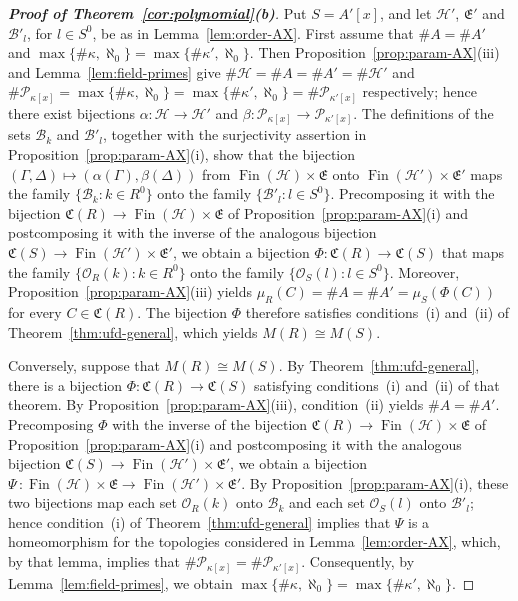 \documentclass[12pt,reqno,a4paper]{amsart}
\newcommand{\Pe}{\mathcal{P}}
\DeclareMathOperator{\Fin}{Fin}
\theoremstyle{plain}
\theoremstyle{definition}
\begin{document}
\begin{proof}[\normalfont\bfseries Proof of Theorem~\ref{cor:polynomial}(b)]
Put $S=A'[x]$, and let $\mathcal{H}'$, $\mathfrak{E}'$ and $\mathcal{B}'_l$, for $l\in S^0$, be as in Lemma~\ref{lem:order-AX}. First assume that $\#A=\#A'$ and $\max\{\#\kappa,\aleph_0\}=\max\{\#\kappa',\aleph_0\}$. Then Proposition~\ref{prop:param-AX}(iii) and Lemma~\ref{lem:field-primes} give $\#\mathcal{H}=\#A=\#A'=\#\mathcal{H}'$ and $\#\Pe_{\kappa[x]}=\max\{\#\kappa,\aleph_0\}=\max\{\#\kappa',\aleph_0\}=\#\Pe_{\kappa'[x]}$ respectively; hence there exist bijections $\alpha\colon\mathcal{H}\to\mathcal{H}'$ and $\beta\colon\Pe_{\kappa[x]}\to\Pe_{\kappa'[x]}$. The definitions of the sets $\mathcal{B}_k$ and $\mathcal{B}'_l$, together with the surjectivity assertion in Proposition~\ref{prop:param-AX}(i), show that the bijection $(\Gamma,\Delta)\mapsto(\alpha(\Gamma),\beta(\Delta))$ from $\Fin(\mathcal{H})\times\mathfrak{E}$ onto $\Fin(\mathcal{H}')\times\mathfrak{E}'$ maps the family $\{\mathcal{B}_k:k\in R^0\}$ onto the family $\{\mathcal{B}'_l:l\in S^0\}$. Precomposing it with the bijection $\mathfrak{C}(R)\to\Fin(\mathcal{H})\times\mathfrak{E}$ of Proposition~\ref{prop:param-AX}(i) and postcomposing it with the inverse of the analogous bijection $\mathfrak{C}(S)\to\Fin(\mathcal{H}')\times\mathfrak{E}'$, we obtain a bijection $\Phi\colon\mathfrak{C}(R)\to\mathfrak{C}(S)$ that maps the family $\{\mathcal{O}_R(k):k\in R^0\}$ onto the family $\{\mathcal{O}_S(l):l\in S^0\}$. Moreover, Proposition~\ref{prop:param-AX}(iii) yields $\mu_R(C)=\#A=\#A'=\mu_S(\Phi(C))$ for every $C\in\mathfrak{C}(R)$. The bijection $\Phi$ therefore satisfies conditions~(i) and~(ii) of Theorem~\ref{thm:ufd-general}, which yields $M(R)\cong M(S)$.

Conversely, suppose that $M(R)\cong M(S)$. By Theorem~\ref{thm:ufd-general}, there is a bijection $\Phi\colon\mathfrak{C}(R)\to\mathfrak{C}(S)$ satisfying conditions~(i) and~(ii) of that theorem. By Proposition~\ref{prop:param-AX}(iii), condition~(ii) yields $\#A=\#A'$. Precomposing $\Phi$ with the inverse of the bijection $\mathfrak{C}(R)\to\Fin(\mathcal{H})\times\mathfrak{E}$ of Proposition~\ref{prop:param-AX}(i) and postcomposing it with the analogous bijection $\mathfrak{C}(S)\to\Fin(\mathcal{H}')\times\mathfrak{E}'$, we obtain a bijection $\Psi\,\colon\Fin(\mathcal{H})\times\mathfrak{E}\to\Fin(\mathcal{H}')\times\mathfrak{E}'$. By Proposition~\ref{prop:param-AX}(i), these two bijections map each set $\mathcal{O}_R(k)$ onto $\mathcal{B}_k$ and each set $\mathcal{O}_S(l)$ onto $\mathcal{B}'_l$; hence condition~(i) of Theorem~\ref{thm:ufd-general} implies that $\Psi$ is a homeomorphism for the topologies considered in Lemma~\ref{lem:order-AX}, which, by that lemma, implies that $\#\Pe_{\kappa[x]}=\#\Pe_{\kappa'[x]}$. Consequently, by Lemma~\ref{lem:field-primes}, we obtain $\max\{\#\kappa,\aleph_0\}=\max\{\#\kappa',\aleph_0\}$.
\end{proof}
\end{document}
